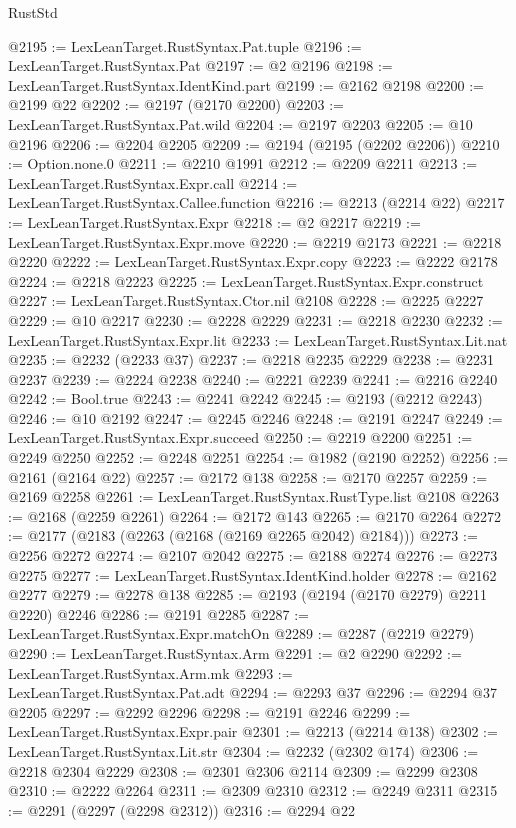 \begin{lexlean}{RustStd}
\begin{coremodule}
@2195 := LexLeanTarget.RustSyntax.Pat.tuple
@2196 := LexLeanTarget.RustSyntax.Pat
@2197 := @2 @2196
@2198 := LexLeanTarget.RustSyntax.IdentKind.part
@2199 := @2162 @2198
@2200 := @2199 @22
@2202 := @2197 (@2170 @2200)
@2203 := LexLeanTarget.RustSyntax.Pat.wild
@2204 := @2197 @2203
@2205 := @10 @2196
@2206 := @2204 @2205
@2209 := @2194 (@2195 (@2202 @2206))
@2210 := Option.none.{0}
@2211 := @2210 @1991
@2212 := @2209 @2211
@2213 := LexLeanTarget.RustSyntax.Expr.call
@2214 := LexLeanTarget.RustSyntax.Callee.function
@2216 := @2213 (@2214 @22)
@2217 := LexLeanTarget.RustSyntax.Expr
@2218 := @2 @2217
@2219 := LexLeanTarget.RustSyntax.Expr.move
@2220 := @2219 @2173
@2221 := @2218 @2220
@2222 := LexLeanTarget.RustSyntax.Expr.copy
@2223 := @2222 @2178
@2224 := @2218 @2223
@2225 := LexLeanTarget.RustSyntax.Expr.construct
@2227 := LexLeanTarget.RustSyntax.Ctor.nil @2108
@2228 := @2225 @2227
@2229 := @10 @2217
@2230 := @2228 @2229
@2231 := @2218 @2230
@2232 := LexLeanTarget.RustSyntax.Expr.lit
@2233 := LexLeanTarget.RustSyntax.Lit.nat
@2235 := @2232 (@2233 @37)
@2237 := @2218 @2235 @2229
@2238 := @2231 @2237
@2239 := @2224 @2238
@2240 := @2221 @2239
@2241 := @2216 @2240
@2242 := Bool.true
@2243 := @2241 @2242
@2245 := @2193 (@2212 @2243)
@2246 := @10 @2192
@2247 := @2245 @2246
@2248 := @2191 @2247
@2249 := LexLeanTarget.RustSyntax.Expr.succeed
@2250 := @2219 @2200
@2251 := @2249 @2250
@2252 := @2248 @2251
@2254 := @1982 (@2190 @2252)
@2256 := @2161 (@2164 @22)
@2257 := @2172 @138
@2258 := @2170 @2257
@2259 := @2169 @2258
@2261 := LexLeanTarget.RustSyntax.RustType.list @2108
@2263 := @2168 (@2259 @2261)
@2264 := @2172 @143
@2265 := @2170 @2264
@2272 := @2177 (@2183 (@2263 (@2168 (@2169 @2265 @2042) @2184)))
@2273 := @2256 @2272
@2274 := @2107 @2042
@2275 := @2188 @2274
@2276 := @2273 @2275
@2277 := LexLeanTarget.RustSyntax.IdentKind.holder
@2278 := @2162 @2277
@2279 := @2278 @138
@2285 := @2193 (@2194 (@2170 @2279) @2211 @2220) @2246
@2286 := @2191 @2285
@2287 := LexLeanTarget.RustSyntax.Expr.matchOn
@2289 := @2287 (@2219 @2279)
@2290 := LexLeanTarget.RustSyntax.Arm
@2291 := @2 @2290
@2292 := LexLeanTarget.RustSyntax.Arm.mk
@2293 := LexLeanTarget.RustSyntax.Pat.adt
@2294 := @2293 @37
@2296 := @2294 @37 @2205
@2297 := @2292 @2296
@2298 := @2191 @2246
@2299 := LexLeanTarget.RustSyntax.Expr.pair
@2301 := @2213 (@2214 @138)
@2302 := LexLeanTarget.RustSyntax.Lit.str
@2304 := @2232 (@2302 @174)
@2306 := @2218 @2304 @2229
@2308 := @2301 @2306 @2114
@2309 := @2299 @2308
@2310 := @2222 @2264
@2311 := @2309 @2310
@2312 := @2249 @2311
@2315 := @2291 (@2297 (@2298 @2312))
@2316 := @2294 @22

\end{coremodule}
\end{lexlean}
